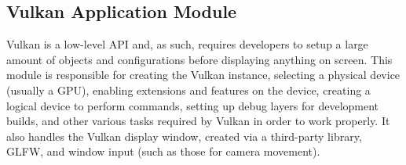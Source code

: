 \subsection{Vulkan Application Module}
Vulkan is a low-level API and, as such, requires developers to setup a large amount of objects and configurations before displaying anything on screen. This module is responsible for creating the Vulkan instance, selecting a physical device (usually a GPU), enabling extensions and features on the device, creating a logical device to perform commands, setting up debug layers for development builds, and other various tasks required by Vulkan in order to work properly. It also handles the Vulkan display window, created via a third-party library, GLFW, and window input (such as those for camera movement).

